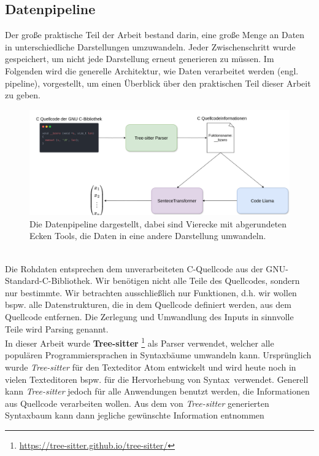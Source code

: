 \documentclass[12pt,letterpaper,ngerman]{article}
\begin{document}
\subsection{Datenpipeline}
Der große praktische Teil der Arbeit bestand darin, eine große 
Menge an Daten in unterschiedliche Darstellungen umzuwandeln. 
Jeder Zwischenschritt wurde gespeichert, um nicht jede Darstellung 
erneut generieren zu müssen. Im Folgenden wird die generelle Architektur,
wie Daten verarbeitet werden (engl. pipeline), vorgestellt, um einen 
Überblick über den praktischen Teil dieser Arbeit zu geben.
\begin{figure}
  \begin{center}
    \includegraphics[scale=0.35]{abb/data-pipeline-2.drawio.png}
  \end{center}
  \caption{
    Die Datenpipeline dargestellt, dabei 
    sind Vierecke mit abgerundeten Ecken Tools, die Daten in eine 
    andere Darstellung umwandeln.
  }
\end{figure}\\
Die Rohdaten entsprechen dem unverarbeiteten 
C-Quellcode aus der GNU-Standard-C-Bibliothek. 
Wir benötigen nicht alle Teile des Quellcodes, sondern nur bestimmte.
Wir betrachten ausschließlich nur Funktionen, d.h. wir wollen
bspw. alle Datenstrukturen, die in dem Quellcode definiert werden,
aus dem Quellcode entfernen. Die Zerlegung und Umwandlung des
Inputs in sinnvolle Teile wird Parsing genannt.\\
In dieser Arbeit wurde {\bf Tree-sitter} 
\footnote{\url{https://tree-sitter.github.io/tree-sitter/}} als
Parser verwendet, welcher
alle populären Programmiersprachen in Syntaxbäume umwandeln kann.
Ursprünglich wurde \textit{Tree-sitter} für den Texteditor Atom
entwickelt und wird heute noch in vielen Texteditoren bspw. 
für die Hervorhebung von Syntax verwendet. Generell kann 
\textit{Tree-sitter} jedoch
für alle Anwendungen benutzt werden, die Informationen aus Quellcode
verarbeiten wollen. Aus dem von \textit{Tree-sitter} generierten
Syntaxbaum kann dann jegliche gewünschte Information entnommen 
\end{document}
